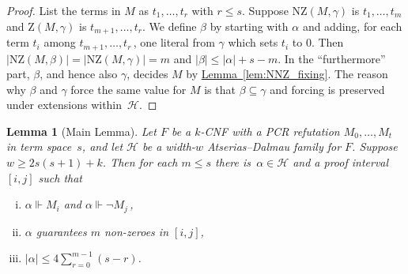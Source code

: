 \documentclass[11pt]{article}
\numberwithin{equation}{section}
\newtheorem{lemma}[theorem]{Lemma}
\theoremstyle{definition}
\theoremstyle{plain}
\newcommand{\expref}[2]{\hyperref[#2]{#1~\ref{#2}}}
\newcommand\calH{\mathcal{H}}
\newcommand\rmNZ{\mathrm{NZ}}
\newcommand\rmZ{\mathrm{Z}}
\begin{document}
\begin{proof}
List the terms in $M$ as $t_1, \dots, t_r$ with $r \le s$.
Suppose $\rmNZ(M, \gamma)$ is $t_1, \dots, t_m$ and 
$\rmZ(M, \gamma)$ is $t_{m+1}, \dots, t_r$.
We define $\beta$ by starting with $\alpha$ and adding, for 
each term $t_i$ among $t_{m+1}, \dots, t_r$\,, one literal from $\gamma$ which sets $t_i$ to $0$.
Then  $|\rmNZ(M, \beta)|=|\rmNZ(M, \gamma)| = m$ and $|\beta| \le |\alpha|+s-m$.
In the ``furthermore'' part, $\beta$, and hence also $\gamma$,
decides $M$ by  \expref{Lemma}{lem:NNZ_fixing}. 
The reason why $\beta$ and $\gamma$ force the same value for $M$ 
is that \mbox{$\beta \subseteq \gamma$} and
forcing is preserved under extensions within~$\calH$.
\end{proof}


\begin{lemma}[Main Lemma]\label{lem:main} 
Let $F$ be a $k$-CNF with a PCR refutation
$M_0, \ldots, M_t$ in term space~$s$, 
and let $\calH$ be a width-$w$ Atserias--Dalmau family for $F$.
Suppose~$w \ge 2s(s+1)+k$.
Then for each $m \le s$ there is~$\alpha \in \calH$ 
and a proof interval $[i,j]$ such that
\begin{enumerate}[(i)]
\item 
$\alpha \Vdash M_{i}$ and  $\alpha \Vdash \neg M_{j}$\,,
\item 
$\alpha$ guarantees $m$ non-zeroes in $[i,j]$,
\item 
$|\alpha| \le \displaystyle {4\sum_{r=0}^{m-1} (s - r)}$.
\end{enumerate}
\end{lemma}
\end{document}
